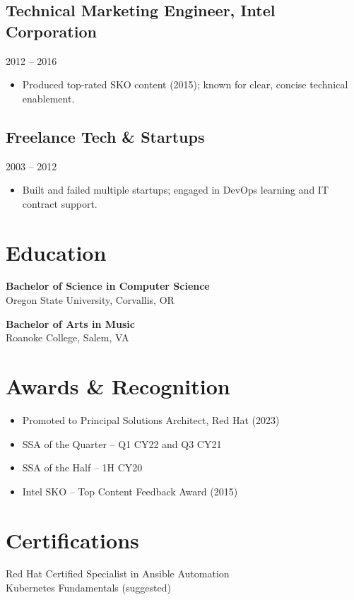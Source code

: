 \documentclass[11pt]{article}
\begin{document}
\subsection{Technical Marketing Engineer, Intel Corporation}
\hfill 2012 – 2016
\begin{itemize}[leftmargin=*]
    \item Produced top-rated SKO content (2015); known for clear, concise technical enablement.
\end{itemize}

\subsection{Freelance Tech \& Startups}
\hfill 2003 – 2012
\begin{itemize}[leftmargin=*]
    \item Built and failed multiple startups; engaged in DevOps learning and IT contract support.
\end{itemize}

\section*{Education}
\textbf{Bachelor of Science in Computer Science} \\
Oregon State University, Corvallis, OR

\textbf{Bachelor of Arts in Music} \\
Roanoke College, Salem, VA

\section*{Awards \& Recognition}
\begin{itemize}[leftmargin=*]
    \item Promoted to Principal Solutions Architect, Red Hat (2023)
    \item SSA of the Quarter – Q1 CY22 and Q3 CY21
    \item SSA of the Half – 1H CY20
    \item Intel SKO – Top Content Feedback Award (2015)
\end{itemize}

\section*{Certifications}
Red Hat Certified Specialist in Ansible Automation \\
Kubernetes Fundamentals (suggested) \\
[List others if held, e.g., AWS, CKA]
\end{document}
